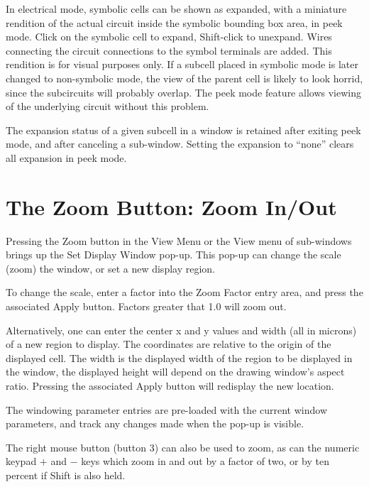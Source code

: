 In electrical mode, symbolic cells can be shown as expanded, with a
miniature rendition of the actual circuit inside the symbolic bounding
box area, in peek mode.  Click on the symbolic cell to expand, {\kb
Shift}-click to unexpand.  Wires connecting the circuit connections to
the symbol terminals are added.  This rendition is for visual purposes
only.  If a subcell placed in symbolic mode is later changed to
non-symbolic mode, the view of the parent cell is likely to look
horrid, since the subcircuits will probably overlap.  The peek mode
feature allows viewing of the underlying circuit without this problem.

The expansion status of a given subcell in a window is retained after
exiting peek mode, and after canceling a sub-window.  Setting the
expansion to ``none'' clears all expansion in peek mode.


\section{The {\cb Zoom} Button: Zoom In/Out}
Pressing the {\cb Zoom} button in the {\cb View Menu} or the {\cb
View} menu of sub-windows brings up the {\cb Set Display Window}
pop-up.  This pop-up can change the scale (zoom) the window, or set a
new display region.

To change the scale, enter a factor into the {\cb Zoom Factor} entry
area, and press the associated {\cb Apply} button.  Factors greater
that 1.0 will zoom out.

Alternatively, one can enter the center x and y values and width (all
in microns) of a new region to display.  The coordinates are relative
to the origin of the displayed cell.  The width is the displayed width
of the region to be displayed in the window, the displayed height will
depend on the drawing window's aspect ratio.  Pressing the associated
{\cb Apply} button will redisplay the new location.

The windowing parameter entries are pre-loaded with the current window
parameters, and track any changes made when the pop-up is visible.

The right mouse button (button 3) can also be used to zoom, as can the
numeric keypad {\kb $+$} and {\kb $-$} keys which zoom in and out by a
factor of two, or by ten percent if {\kb Shift} is also held.

